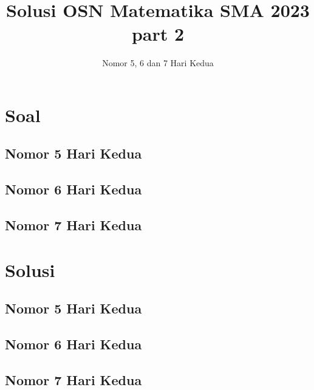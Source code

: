 \documentclass[12pt]{scrartcl}
\title{Solusi OSN Matematika SMA 2023 part 2}
\author{Nomor 5, 6 dan 7 Hari Kedua}
\date{}
\begin{document}
\maketitle

\renewcommand*\contentsname{Daftar Isi}
\tableofcontents

\newpage
\newpage
\section{Soal}
\subsection{Nomor 5 Hari Kedua}

\subsection{Nomor 6 Hari Kedua}

\subsection{Nomor 7 Hari Kedua}


\section{Solusi}
\subsection{Nomor 5 Hari Kedua}

\subsection{Nomor 6 Hari Kedua}

\subsection{Nomor 7 Hari Kedua}

\end{document}
